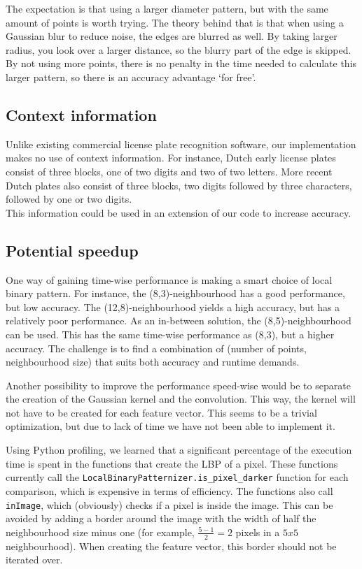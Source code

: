 \documentclass[a4paper]{article}
\begin{document}
The expectation is that using a larger diameter pattern, but with the same
amount of points is worth trying. The theory behind that is that when using a
Gaussian blur to reduce noise, the edges are blurred as well. By taking larger
radius, you look over a larger distance, so the blurry part of the edge is
skipped. By not using more points, there is no penalty in the time needed to
calculate this larger pattern, so there is an accuracy advantage `for free'.

\subsection{Context information}

Unlike existing commercial license plate recognition software, our
implementation makes no use of context information. For instance, Dutch early
license plates consist of three blocks, one of two digits and two of two
letters. More recent Dutch plates also consist of three blocks, two digits
followed by three characters, followed by one or two digits. \\
This information could be used in an extension of our code to increase
accuracy.

\subsection{Potential speedup}

One way of gaining time-wise performance is making a smart choice of local
binary pattern. For instance, the (8,3)-neighbourhood has a good performance,
but low accuracy. The (12,8)-neighbourhood yields a high accuracy, but has a
relatively poor performance. As an in-between solution, the (8,5)-neighbourhood
can be used. This has the same time-wise performance as (8,3), but a higher
accuracy. The challenge is to find a combination of (number of points,
neighbourhood size) that suits both accuracy and runtime demands.

Another possibility to improve the performance speed-wise would be to separate
the creation of the Gaussian kernel and the convolution. This way, the kernel
will not have to be created for each feature vector. This seems to be a trivial
optimization, but due to lack of time we have not been able to implement it.

Using Python profiling, we learned that a significant percentage of the
execution time is spent in the functions that create the LBP of a pixel. These
functions currently call the \texttt{LocalBinaryPatternizer.is\_pixel\_darker}
function for each comparison, which is expensive in terms of efficiency. The
functions also call \texttt{inImage}, which (obviously) checks if a pixel is
inside the image. This can be avoided by adding a border around the image with
the width of half the neighbourhood size minus one (for example, $\frac{5 -
1}{2} = 2$ pixels in a $5x5$ neighbourhood). When creating the feature vector,
this border should not be iterated over.
\end{document}
